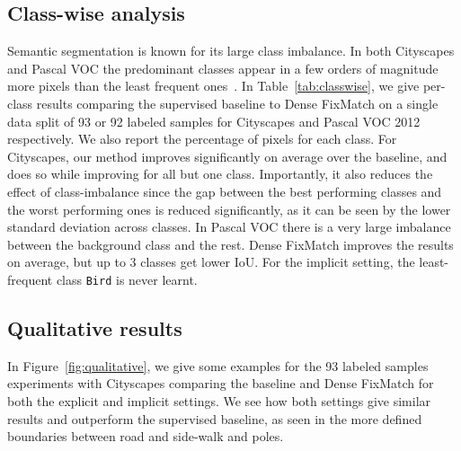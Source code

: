 \subsection{Class-wise analysis}

Semantic segmentation is known for its large class imbalance. In both Cityscapes and Pascal VOC the predominant classes appear in a few orders of magnitude more pixels than the least frequent ones~\cite{cityscapes,voc}. In Table~\ref{tab:classwise}, we give per-class results comparing the supervised baseline to Dense FixMatch on a single data split of 93 or 92 labeled samples for Cityscapes and Pascal VOC 2012 respectively. We also report the percentage of pixels for each class. For Cityscapes, our method improves significantly on average over the baseline, and does so while improving for all but one class. Importantly, it also reduces the effect of class-imbalance since the gap between the best performing classes and the worst performing ones is reduced significantly, as it can be seen by the lower standard deviation across classes. In Pascal VOC there is a very large imbalance between the background class and the rest. Dense FixMatch improves the results on average, but up to 3 classes get lower IoU. For the implicit setting, the least-frequent class \texttt{Bird} is never learnt.

 

\subsection{Qualitative results}

In Figure~\ref{fig:qualitative}, we give some examples for the 93 labeled samples experiments with Cityscapes comparing the baseline and Dense FixMatch for both the explicit and implicit settings. We see how both settings give similar results and outperform the supervised baseline, as seen in the more defined boundaries between road and side-walk and poles.

\vspace{-5pt} 